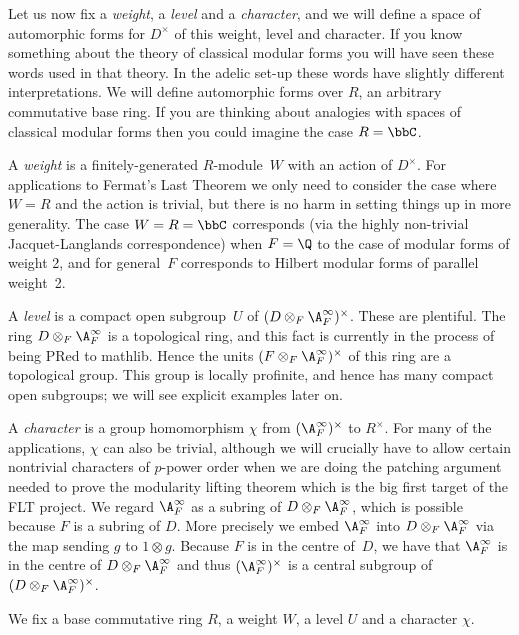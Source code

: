 Let us now fix a \emph{weight}, a \emph{level} and a \emph{character}, and we will define
a space of automorphic forms for $D^\times$ of this weight, level and character. If you know
something about the theory of classical modular forms you will have seen these words used in that
theory. In the adelic set-up these words have slightly different interpretations. We will define
automorphic forms over $R$, an arbitrary commutative base ring. If you are thinking about analogies
with spaces of classical modular forms then you could imagine the case $R=\bbC$.

A \emph{weight} is a finitely-generated $R$-module~$W$ with an action of $D^\times$. For applications
to Fermat's Last Theorem we only need to consider the case where $W=R$ and the action is trivial,
but there is no harm in setting things up in more generality. The case $W=R=\bbC$ corresponds (via
the highly non-trivial Jacquet-Langlands correspondence) when $F=\Q$ to the case of modular forms
of weight 2, and for general~$F$ corresponds to Hilbert modular forms of parallel weight~2.

A \emph{level} is a compact open subgroup~$U$ of $(D\otimes_F\A_F^\infty)^\times$. These are plentiful.
The ring $D\otimes_F\A_F^\infty$ is a topological ring, and this fact is currently in the process
of being PRed to mathlib. Hence the units $(F\otimes_F\A_F^\infty)^\times$ of this ring are a topological
group. This group is locally profinite, and hence has many compact open subgroups; we will see
explicit examples later on.

A \emph{character} is a group homomorphism $\chi$ from $(\A_F^\infty)^\times$ to $R^\times$. For many
of the applications, $\chi$ can also be trivial, although we will crucially have to allow
certain nontrivial characters of $p$-power order when we are doing the patching argument needed
to prove the modularity lifting theorem which is the big first target of the FLT project.
We regard $\A_F^\infty$ as a subring of $D\otimes_F\A_F^\infty$, which is possible because
$F$ is a subring of $D$. More precisely we embed $\A_F^\infty$ into $D\otimes_F\A_F^\infty$
via the map sending $g$ to $1\otimes g$. Because $F$ is in the centre of~$D$, we have
that $\A_F^\infty$ is in the centre of $D\otimes_F\A_F^\infty$ and thus $(\A_F^\infty)^\times$
is a central subgroup of $(D\otimes_F\A_F^\infty)^\times$.

We fix a base commutative ring $R$, a weight $W$, a level $U$ and a character $\chi$.

